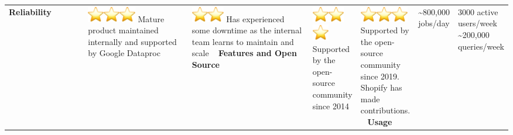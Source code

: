\begin{longtable}{|p{0.23\linewidth}|p{0.35\linewidth}|p{0.42\linewidth}|}
\textbf{Reliability} &
\includegraphics[width=0.28in,height=0.28in]{images/image3.png}\includegraphics[width=0.28in,height=0.28in]{images/image3.png}\includegraphics[width=0.28in,height=0.28in]{images/image3.png}\newline
Mature product maintained internally and supported by Google Dataproc &
\includegraphics[width=0.28in,height=0.28in]{images/image3.png}\includegraphics[width=0.28in,height=0.28in]{images/image3.png}\newline
Has experienced some downtime as the internal team learns to maintain and scale \ \hline
\textbf{Features and Open Source} &
\includegraphics[width=0.28in,height=0.28in]{images/image3.png}\includegraphics[width=0.28in,height=0.28in]{images/image3.png}\includegraphics[width=0.28in,height=0.28in]{images/image3.png}\newline
Supported by the open-source community since 2014 &
\includegraphics[width=0.28in,height=0.28in]{images/image3.png}\includegraphics[width=0.28in,height=0.28in]{images/image3.png}\includegraphics[width=0.28in,height=0.28in]{images/image3.png}\newline
Supported by the open-source community since 2019. Shopify has made contributions. \ \hline
\textbf{Usage} &
\textasciitilde800,000 jobs/day &
3000 active users/week \newline
\textasciitilde200,000 queries/week \ \hline
\end{longtable}

